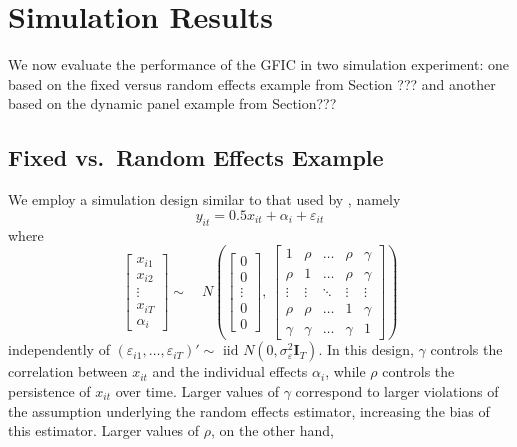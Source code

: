 \section{Simulation Results}
\label{sec:simulation}
We now evaluate the performance of the GFIC in two simulation experiment: one based on the fixed versus random effects example from Section ??? and another based on the dynamic panel example from Section??? 

\subsection{Fixed vs.\ Random Effects Example}
We employ a simulation design similar to that used by \cite{GuggenbergerRE}, namely
\begin{equation*}
  y_{it} = 0.5 x_{it} + \alpha_i + \varepsilon_{it}
\end{equation*}
where
\[
  \begin{bmatrix}
x_{i1}\\
x_{i2}\\
\vdots\\
x_{iT}\\
\alpha_i
\end{bmatrix}  \sim \quad N \left (
\begin{bmatrix}
0\\
0\\
\vdots\\
0\\
0
\end{bmatrix} , \, 
\begin{bmatrix}
1 & \rho & \ldots & \rho & \gamma\\
\rho & 1 & \ldots & \rho & \gamma\\
\vdots & \vdots&  \ddots & \vdots &\vdots\\
\rho & \rho & \ldots & 1 & \gamma\\
\gamma& \gamma &\ldots& \gamma & 1 
\end{bmatrix}
\right)
\]
independently of $\left( \varepsilon_{i1}, \dots, \varepsilon_{iT} \right)' \sim \mbox{ iid } N(0, \sigma_{\varepsilon}^2 \mathbf{I}_T)$.
In this design, $\gamma$ controls the correlation between $x_{it}$ and the individual effects $\alpha_i$, while $\rho$ controls the persistence of $x_{it}$ over time.
Larger values of $\gamma$ correspond to larger violations of the assumption underlying the random effects estimator, increasing the bias of this estimator.
Larger values of $\rho$, on the other hand,

